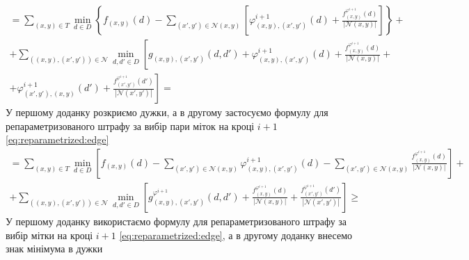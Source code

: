 \begin{equation*}
\begin{gathered}
    = \sum \limits_{\left(x, y \right) \in T}
        \min \limits_{d \in D} \left\{
            f_{ \left(x, y \right)} \left( d \right) -
            \sum \limits_{\left(x', y' \right) \in \mathcal{N}\left(x, y \right)}
            \left[
                \varphi_{\left(x, y \right), \left(x', y' \right)}^{i + 1}
                    \left( d \right) +
                \frac{f_{\left(x, y \right)}^{\varphi^{i + 1}} \left( d \right)}{\left| \mathcal{N} \left(x, y \right) \right|}
            \right]
        \right\} + \\
    + \sum \limits_{\left( \left(x, y \right), \left(x', y' \right) \right) \in \mathcal{N}}
        \min \limits_{d, d' \in D} \left[
            g_{\left(x, y \right), \left(x', y' \right)} \left( d, d' \right) +
            \varphi_{\left(x, y \right), \left(x', y' \right)}^{i + 1}
                \left( d \right) +
            \frac{f_{\left( x, y \right)}^{\varphi^{i + 1}} \left( d \right)}{\left| \mathcal{N}\left( x, y \right) \right|}
            + \right. \\
            \left. + \varphi_{\left(x', y' \right), \left(x, y \right)}^{i + 1}
                \left( d' \right) +
            \frac{f_{\left( x', y' \right)}^{\varphi^{i + 1}} \left( d' \right)}{\left| \mathcal{N}\left( x', y' \right) \right|}
        \right] =
\end{gathered}
\end{equation*}
У першому доданку розкриємо дужки,
а в другому застосуємо формулу для репараметризованого штрафу за вибір пари
міток на кроці $i + 1$
\eqref{eq:reparametrized:edge}
\begin{equation*}
\begin{gathered}
    = \sum \limits_{\left(x, y \right) \in T}
        \min \limits_{d \in D} \left[
            f_{\left(x, y \right)} \left( d \right) -
            \sum \limits_{\left(x' ,y' \right) \in \mathcal{N}\left( x, y \right)}
                \varphi_{\left(x, y \right), \left(x', y' \right)}^{i + 1}
                    \left( d \right) -
            \sum \limits_{\left(x', y' \right) \in \mathcal{N}\left( x, y \right)}
                \frac{f_{\left( x, y \right)}^{\varphi^{i + 1}}\left( d \right)}{\left|\mathcal{N}\left(x, y \right) \right|}
        \right] + \\
    + \sum \limits_{\left( \left(x, y \right), \left(x', y' \right) \right) \in \mathcal{N}}
        \min \limits_{d, d' \in D} \left[
            g_{\left(x, y \right), \left(x', y' \right)}^{\varphi^{i + 1}}
                \left( d, d'\right) +
            \frac{f_{\left(x, y \right)}^{\varphi^{i + 1}}\left( d \right)}{\left| \mathcal{N}\left(x, y \right) \right|} +
            \frac{f_{\left(x', y' \right)}^{\varphi^{i + 1}}\left( d' \right)}{\left| \mathcal{N}\left(x', y' \right) \right|}
        \right] \ge
\end{gathered}
\end{equation*}
У першому доданку використаємо формулу для репараметризованого штрафу за вибір
мітки на кроці $i + 1$ \eqref{eq:reparametrized:edge},
а в другому доданку внесемо знак мінімума в дужки

